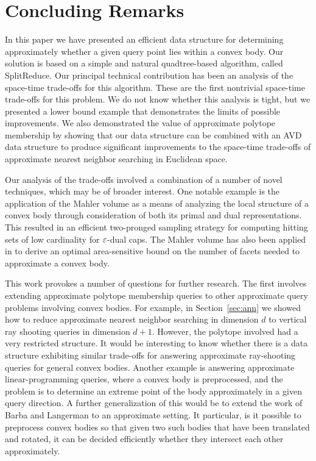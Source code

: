 \documentclass[11pt]{article}   \usepackage[letterpaper,hmargin=2.1cm,vmargin=3cm]{geometry}
\newcommand{\alg}{\textrm{SplitReduce}}
\begin{document}
\section{Concluding Remarks}


In this paper we have presented an efficient data structure for determining approximately whether a given query point lies within a convex body. Our solution is based on a simple and natural quadtree-based algorithm, called {\alg}. Our principal technical contribution has been an analysis of the space-time trade-offs for this algorithm. These are the first nontrivial space-time trade-offs for this problem. We do not know whether this analysis is tight, but we presented a lower bound example that demonstrates the limits of possible improvements. We also demonstrated the value of approximate polytope membership by showing that our data structure can be combined with an AVD data structure to produce significant improvements to the space-time trade-offs of approximate nearest neighbor searching in Euclidean space.

Our analysis of the trade-offs involved a combination of a number of novel techniques, which may be of broader interest. One notable example is the application of the Mahler volume as a means of analyzing the local structure of a convex body through consideration of both its primal and dual representations. This resulted in an efficient two-pronged sampling strategy for computing hitting sets of low cardinality for $\varepsilon$-dual caps. The Mahler volume has also been applied in \cite{AFM12} to derive an optimal area-sensitive bound on the number of facets needed to approximate a convex body.

This work provokes a number of questions for further research. The first involves extending approximate polytope membership queries to other approximate query problems involving convex bodies. For example, in Section~\ref{sec:ann} we showed how to reduce approximate nearest neighbor searching in dimension $d$ to vertical ray shooting queries in dimension $d+1$. However, the polytope involved had a very restricted structure. It would be interesting to know whether there is a data structure exhibiting similar trade-offs for answering approximate ray-shooting queries for general convex bodies. Another example is answering approximate linear-programming queries, where a convex body is preprocessed, and the problem is to determine an  extreme point of the body approximately in a given query direction. A further generalization of this would be to extend the work of Barba and Langerman \cite{BaL15} to an approximate setting. It particular, is it possible to preprocess convex bodies so that given two such bodies that have been translated and rotated, it can be decided efficiently whether they intersect each other approximately.
\end{document}
